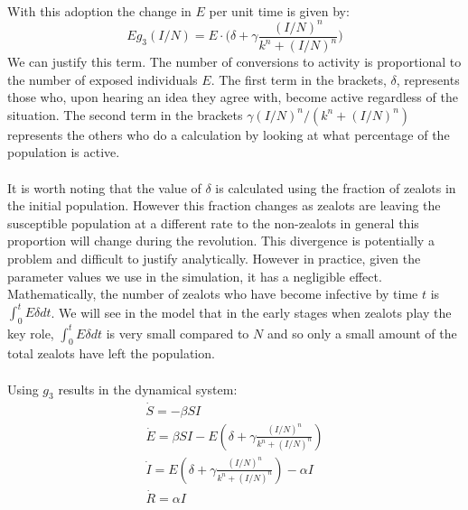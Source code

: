 \\
With this adoption the change in $E$ per unit time is given by:
\begin{equation*}\label{eq:g_3}
Eg_3(I/N)=E\cdot \big(\delta + \gamma\frac{(I/N)^n}{k^n + (I/N)^n}\big)
\end{equation*}
We can justify this term. The number of conversions to activity is proportional to the number of exposed individuals $E$. The first term in the brackets, $\delta$, represents those who, upon hearing an idea they agree with, become active regardless of the situation. The second term in the brackets $\gamma {(I/N)^n}/({k^n + (I/N)^n})$ represents the others who do a calculation by looking at what percentage of the population is active.\\
\\
It is worth noting that the value of $\delta$ is calculated using the fraction of zealots in the initial population. However this fraction changes as zealots are leaving the susceptible population at a different rate to the non-zealots in general this proportion will change during the revolution. This divergence is potentially a problem and difficult to justify analytically. However in practice, given the parameter values we use in the simulation, it has a negligible effect. Mathematically, the number of zealots who have become infective by time $t$ is $\int_0^t E\delta dt$. We will see in the model that in the early stages when zealots play the key role, $\int_0^t E\delta dt$ is very small compared to $N$ and so only a small amount of the total zealots have left the population.
\label{mm}
\\
\\
Using $g_3$ results in the dynamical system:
\begin{eqnarray}
\dot S=-\beta S I\\
\dot E=\beta S I- E \left(\delta + \gamma\frac{(I/N)^n}{k^n + (I/N)^n}\right)\\
\dot I= E \left(\delta + \gamma\frac{(I/N)^n}{k^n + (I/N)^n}\right)-\alpha I\\
\dot R=\alpha I
\end{eqnarray}

